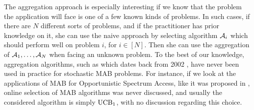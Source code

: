 

The aggregation approach is especially interesting if we know that the problem the application will face is one of a few known kinds of problems.
In such cases, if there are $N$ different sorts of problems, and if the practitioner has prior knowledge on it, she can use the naive approach by selecting algorithm $\mathcal{A}_i$ which should perform well on problem $i$, for $i\in[N]$.
Then she can use the aggregation of $\mathcal{A}_1,\dots,\mathcal{A}_N$ when facing an unknown problem.
%
%
To the best of our knowledge, aggregation algorithms, such as \ExpQ{} which dates back from 2002 \cite{Auer02},
have never been used in practice for stochastic MAB problems.
For instance, if we look at the applications of MAB for Opportunistic Spectrum Access, like it was proposed in \cite{Jouini09,Jouini10,Jouini12},
online selection of MAB algorithms was never discussed,
and usually the considered algorithm is simply $\mathrm{UCB}_1$, with no discussion regarding this choice.




